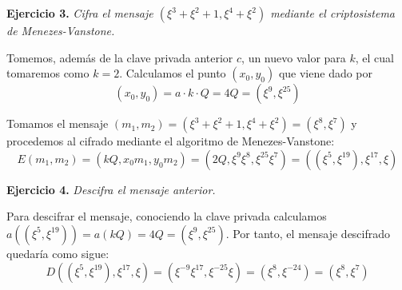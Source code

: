 \documentclass[fleqn]{article}
\begin{document}
    \textbf{Ejercicio 3. }\textit{Cifra el mensaje $(\xi^3 + \xi^2 + 1, \xi^4 + \xi^2)$ mediante el criptosistema de Menezes-Vanstone.}
    \vspace{0.5cm}

    Tomemos, además de la clave privada anterior $c$, un nuevo valor para $k$, el cual tomaremos como $k = 2$. Calculamos el punto $(x_0, y_0)$ que viene dado por 
    $$ (x_0, y_0) = a \cdot k \cdot Q = 4Q = (\xi^{9}, \xi^{25})$$

    Tomamos el mensaje $(m_1, m_2) = (\xi^3 + \xi^2 + 1, \xi^4 + \xi^2) = (\xi^{8}, \xi^{7})$ y procedemos al cifrado mediante el algoritmo de Menezes-Vanstone:
    $$ E(m_1, m_2) = (kQ, x_0 m_1, y_0 m_2) = (2Q, \xi^{9} \xi^{8}, \xi^{25} \xi^{7}) = ((\xi^{5}, \xi^{19}), \xi^{17}, \xi)$$

    \textbf{Ejercicio 4. }\textit{Descifra el mensaje anterior.}
    \vspace{0.5cm}

    Para descifrar el mensaje, conociendo la clave privada calculamos $a((\xi^{5}, \xi^{19})) = a(kQ) = 4Q = (\xi^{9}, \xi^{25})$. Por tanto, el mensaje 
    descifrado quedaría como sigue:
    $$ D((\xi^{5}, \xi^{19}), \xi^{17}, \xi) =  (\xi^{-9}\xi^{17}, \xi^{-25}\xi) = (\xi^{8}, \xi^{-24}) = (\xi^{8}, \xi^{7})$$
\end{document}
